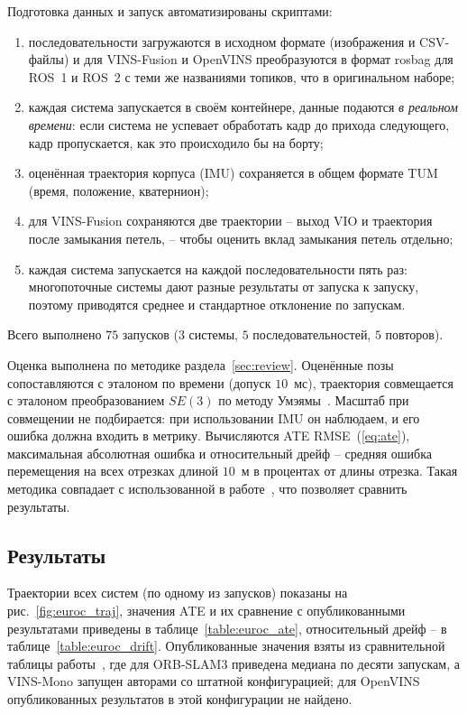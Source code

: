     Подготовка данных и запуск автоматизированы скриптами:
    \begin{enumerate}
        \item последовательности загружаются в исходном формате (изображения и CSV-файлы) и для VINS-Fusion и OpenVINS преобразуются в формат rosbag для ROS~1 и ROS~2 с теми же названиями топиков, что в оригинальном наборе;
        \item каждая система запускается в своём контейнере, данные подаются \emph{в реальном времени}: если система не успевает обработать кадр до прихода следующего, кадр пропускается, как это происходило бы на борту;
        \item оценённая траектория корпуса (IMU) сохраняется в общем формате TUM (время, положение, кватернион);
        \item для VINS-Fusion сохраняются две траектории -- выход VIO и траектория после замыкания петель, -- чтобы оценить вклад замыкания петель отдельно;
        \item каждая система запускается на каждой последовательности пять раз: многопоточные системы дают разные результаты от запуска к запуску, поэтому приводятся среднее и стандартное отклонение по запускам.
    \end{enumerate}
    Всего выполнено $75$ запусков ($3$ системы, $5$ последовательностей, $5$ повторов).

    Оценка выполнена по методике раздела~\ref{sec:review}.
    Оценённые позы сопоставляются с эталоном по времени (допуск $10$~мс), траектория совмещается с эталоном преобразованием $SE(3)$ по методу Умэямы~\cite{umeyama}.
    Масштаб при совмещении не подбирается: при использовании IMU он наблюдаем, и его ошибка должна входить в метрику.
    Вычисляются ATE RMSE~(\ref{eq:ate}), максимальная абсолютная ошибка и относительный дрейф -- средняя ошибка перемещения на всех отрезках длиной $10$~м в процентах от длины отрезка.
    Такая методика совпадает с использованной в работе~\cite{orbslam3}, что позволяет сравнить результаты.

    \subsection{Результаты}

    Траектории всех систем (по одному из запусков) показаны на рис.~\ref{fig:euroc_traj}, значения ATE и их сравнение с опубликованными результатами приведены в таблице~\ref{table:euroc_ate}, относительный дрейф -- в таблице~\ref{table:euroc_drift}.
    Опубликованные значения взяты из сравнительной таблицы работы~\cite{orbslam3}, где для ORB-SLAM3 приведена медиана по десяти запускам, а VINS-Mono запущен авторами со штатной конфигурацией; для OpenVINS опубликованных результатов в этой конфигурации не найдено.


